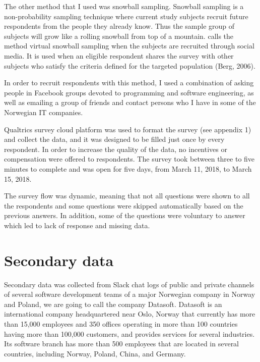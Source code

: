 The other method that I used was snowball sampling. Snowball sampling is a non-probability sampling technique where current study subjects recruit future respondents from the people they already know. Thus the sample group of subjects will grow like a rolling snowball from top of a mountain. \citet{Baltar2012} calls the method virtual snowball sampling when the subjects are recruited through social media. It is used when an eligible respondent shares the survey with other subjects who satisfy the criteria defined for the targeted population (Berg, 2006).

In order to recruit respondents with this method, I used a combination of asking people in Facebook groups devoted to programming and software engineering, as well as emailing a group of friends and contact persons who I have in some of the Norwegian IT companies.

Qualtrics survey cloud platform was used to format the survey (see appendix 1) and collect the data, and it was designed to be filled just once by every respondent. In order to increase the quality of the data, no incentives or compensation were offered to respondents.  The survey took between three to five minutes to complete and was open for five days, from March 11, 2018, to March 15, 2018.

The survey flow was dynamic, meaning that not all questions were shown to all the respondents and some questions were skipped automatically based on the previous answers. In addition, some of the questions were voluntary to answer which led to lack of response and missing data.

\section{Secondary data}

Secondary data was collected from Slack chat logs of public and private channels of several software development teams of a major Norwegian company in Norway and Poland, we are going to call the company Datasoft.
Datasoft is an international company headquartered near Oslo, Norway that currently has more than 15,000 employees and 350 offices operating in more than 100 countries having more than 100,000 customers, and provides services for several industries. Its software branch has more than 500 employees that are located in several countries, including Norway, Poland, China, and Germany.

